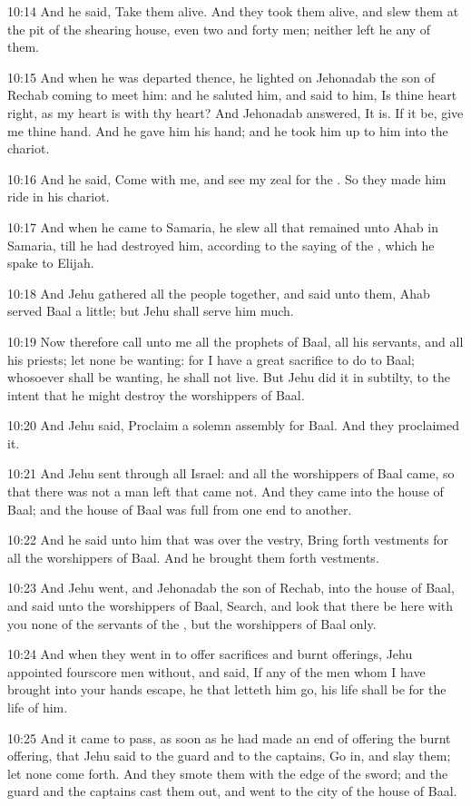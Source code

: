 10:14 And he said, Take them alive. And they took them alive, and slew them at the pit of the shearing house, even two and forty men; neither left he any of them.

10:15 And when he was departed thence, he lighted on Jehonadab the son of Rechab coming to meet him: and he saluted him, and said to him, Is thine heart right, as my heart is with thy heart? And Jehonadab answered, It is. If it be, give me thine hand. And he gave him his hand; and he took him up to him into the chariot.

10:16 And he said, Come with me, and see my zeal for the \LORD. So they made him ride in his chariot.

10:17 And when he came to Samaria, he slew all that remained unto Ahab in Samaria, till he had destroyed him, according to the saying of the \LORD, which he spake to Elijah.

10:18 And Jehu gathered all the people together, and said unto them, Ahab served Baal a little; but Jehu shall serve him much.

10:19 Now therefore call unto me all the prophets of Baal, all his servants, and all his priests; let none be wanting: for I have a great sacrifice to do to Baal; whosoever shall be wanting, he shall not live. But Jehu did it in subtilty, to the intent that he might destroy the worshippers of Baal.

10:20 And Jehu said, Proclaim a solemn assembly for Baal. And they proclaimed it.

10:21 And Jehu sent through all Israel: and all the worshippers of Baal came, so that there was not a man left that came not. And they came into the house of Baal; and the house of Baal was full from one end to another.

10:22 And he said unto him that was over the vestry, Bring forth vestments for all the worshippers of Baal. And he brought them forth vestments.

10:23 And Jehu went, and Jehonadab the son of Rechab, into the house of Baal, and said unto the worshippers of Baal, Search, and look that there be here with you none of the servants of the \LORD, but the worshippers of Baal only.

10:24 And when they went in to offer sacrifices and burnt offerings, Jehu appointed fourscore men without, and said, If any of the men whom I have brought into your hands escape, he that letteth him go, his life shall be for the life of him.

10:25 And it came to pass, as soon as he had made an end of offering the burnt offering, that Jehu said to the guard and to the captains, Go in, and slay them; let none come forth. And they smote them with the edge of the sword; and the guard and the captains cast them out, and went to the city of the house of Baal.

